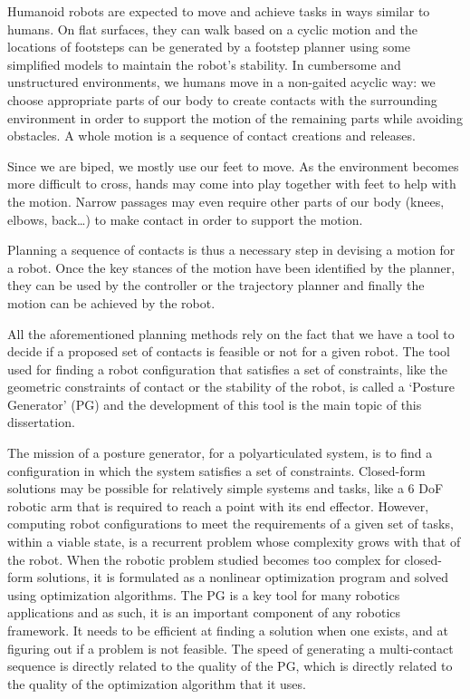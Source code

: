 Humanoid robots are expected to move and achieve tasks in ways similar to humans.
On flat surfaces, they can walk based on a cyclic motion and the locations of footsteps can be generated by a footstep planner using some simplified models to maintain the robot's stability.
In cumbersome and unstructured environments, we humans move in a non-gaited acyclic way: we choose appropriate parts of our body to create contacts with the surrounding environment in order to support the motion of the remaining parts while avoiding obstacles.
A whole motion is a sequence of contact creations and releases.

Since we are biped, we mostly use our feet to move.
As the environment becomes more difficult to cross, hands may come into play together with feet to help with the motion.
Narrow passages may even require other parts of our body (knees, elbows, back\dots) to make contact in order to support the motion.

Planning a sequence of contacts is thus a necessary step in devising a motion for a robot.
Once the key stances of the motion have been identified by the planner, they can be used by the controller or the trajectory planner and finally the motion can be achieved by the robot.

All the aforementioned planning methods rely on the fact that we have a tool to decide if a proposed set of contacts is feasible or not for a given robot.
The tool used for finding a robot configuration that satisfies a set of constraints, like the geometric constraints of contact or the stability of the robot, is called a `Posture Generator' (PG) and the development of this tool is the main topic of this dissertation.

The mission of a posture generator, for a polyarticulated system, is to find a configuration in which the system satisfies a set of constraints.
Closed-form solutions may be possible for relatively simple systems and tasks, like a 6 DoF robotic arm that is required to reach a point with its end effector.
However, computing robot configurations to meet the requirements of a given set of tasks, within a viable state, is a recurrent problem whose complexity grows with that of the robot.
When the robotic problem studied becomes too complex for closed-form solutions, it is formulated as a nonlinear optimization program and solved using optimization algorithms.
The PG is a key tool for many robotics applications and as such, it is an important component of any robotics framework.
It needs to be efficient at finding a solution when one exists, and at figuring out if a problem is not feasible.
The speed of generating a multi-contact sequence is directly related to the quality of the PG, which is directly related to the quality of the optimization algorithm that it uses.

